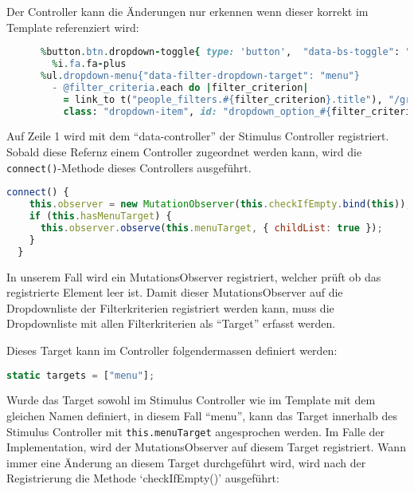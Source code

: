 \newpage

Der Controller kann die Änderungen nur erkennen wenn dieser korrekt im Template
referenziert wird:
\newline

\begin{lstlisting}[language=Ruby]
   %div.dropdown.ml-3{"data-controller": "filter-dropdown"}
      %button.btn.dropdown-toggle{ type: 'button',  "data-bs-toggle": "dropdown", "aria-expanded": "false"}
        %i.fa.fa-plus
      %ul.dropdown-menu{"data-filter-dropdown-target": "menu"}
        - @filter_criteria.each do |filter_criterion|
          = link_to t("people_filters.#{filter_criterion}.title"), "/groups/#{@group.id}/people_filters/#{filter_criterion}",
          class: "dropdown-item", id: "dropdown_option_#{filter_criterion}", data: {turbo_stream: true}
\end{lstlisting}

Auf Zeile 1 wird mit dem ``data-controller'' der Stimulus Controller registriert. Sobald diese Refernz einem Controller zugeordnet werden kann, wird 
die \texttt{connect()}-Methode dieses Controllers ausgeführt.
\newline

\begin{lstlisting}[language=JavaScript]
   connect() {
    this.observer = new MutationObserver(this.checkIfEmpty.bind(this));
    if (this.hasMenuTarget) {
      this.observer.observe(this.menuTarget, { childList: true });
    }
  }
\end{lstlisting}

In unserem Fall wird ein MutationsObserver registriert, welcher prüft ob das registrierte Element
leer ist. Damit dieser MutationsObserver auf die Dropdownliste der Filterkriterien registriert werden kann, muss
die Dropdownliste mit allen Filterkriterien als ``Target'' erfasst werden.

Dieses Target kann im Controller folgendermassen definiert werden:
\newline

\begin{lstlisting}[language=JavaScript]
   static targets = ["menu"];
\end{lstlisting}

\newpage

Wurde das Target sowohl im Stimulus Controller wie im Template mit dem gleichen Namen definiert, in diesem Fall ``menu'',
kann das Target innerhalb des Stimulus Controller mit \texttt{this.menuTarget} angesprochen werden.
Im Falle der Implementation, wird der MutationsObserver auf diesem Target registriert. Wann immer eine Änderung 
an diesem Target durchgeführt wird, wird nach der Registrierung die Methode `checkIfEmpty()' ausgeführt:
\newline

